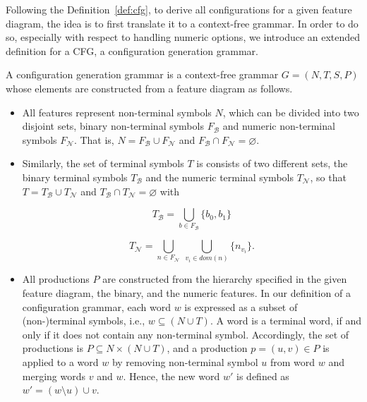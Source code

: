 Following the Definition~\ref{def:cfg}, to derive all configurations for a
given feature diagram, the idea is to first translate it to a context-free
grammar. In order to do so, especially with respect to handling numeric
options, we introduce an extended definition for a CFG, a configuration
generation grammar.

\begin{definition}\label{def:cgg}
A configuration generation grammar is a context-free grammar $G = (N, T, S,
P)$ whose elements are constructed from a feature diagram as follows.

\begin{itemize}
  \item All features represent non-terminal symbols $N$, which can be divided
  into two disjoint sets, binary non-terminal symbols $F_\mathcal{B}$ and
  numeric non-terminal symbols $F_\mathcal{N}$. That is, $N = F_\mathcal{B}
  \cup F_\mathcal{N}$ and $F_\mathcal{B} \cap F_\mathcal{N} = \varnothing$.

  \item Similarly, the set of terminal symbols $T$ is consists of two different
  sets, the binary terminal symbols $T_\mathcal{B}$ and the numeric terminal
  symbols $T_\mathcal{N}$, so that $T = T_\mathcal{B} \cup T_\mathcal{N}$ and
  $T_\mathcal{B} \cap T_\mathcal{N} = \varnothing$ with
  
  \begin{equation}
  T_\mathcal{B} = \bigcup_{b\in F_\mathcal{B}} \lbrace b_0,  b_1\rbrace
  \end{equation}
  
  \begin{equation}
  T_\mathcal{N} = \bigcup_{n\in F_\mathcal{N}} ~ \bigcup_{v_i \in dom(n)}
  \lbrace n_{v_i}\rbrace.
  \end{equation}
  
  \item All productions $P$ are constructed from the hierarchy specified in the
  given feature diagram, the binary, and the numeric features. In our definition
  of a configuration grammar, each word $w$ is expressed as a subset of
  (non-)terminal symbols, i.e., $w \subseteq (N \cup T)$. A word is a terminal
  word, if and only if it does not contain any non-terminal symbol. Accordingly,
  the set of productions is $P \subseteq N \times (N \cup T)$, and a production
  $p = (u, v) \in P$ is applied to a word $w$ by removing non-terminal symbol
  $u$ from word $w$ and merging words $v$ and $w$. Hence, the new word $w'$ is
  defined as $w' = (w \setminus u) \cup v$.


\end{itemize}
\end{definition}
